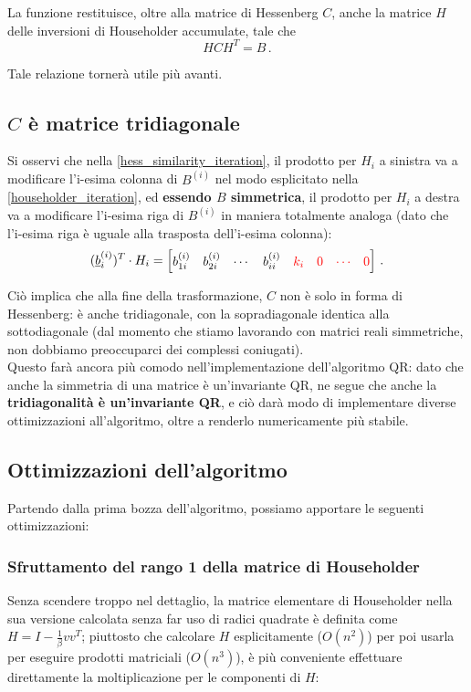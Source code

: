 La funzione restituisce, oltre alla matrice di Hessenberg $C$, anche la matrice 
$H$ delle inversioni di Householder accumulate, tale che
\begin{equation}\label{B_C_similarity}
H C H^T = B \,.
\end{equation}

Tale relazione tornerà utile più avanti.

\subsection{$C$ è matrice tridiagonale}
Si osservi che nella \eqref{hess_similarity_iteration}, il prodotto per $H_i$ a 
sinistra va a modificare l'i-esima colonna di $B^{(i)}$ nel modo esplicitato 
nella \eqref{householder_iteration}, ed \textbf{essendo $B$ simmetrica}, il 
prodotto per $H_i$ a destra va a modificare l'i-esima riga di $B^{(i)}$ in 
maniera totalmente analoga (dato che l'i-esima riga è uguale alla trasposta 
dell'i-esima colonna):
\begin{equation*}
(\underline{b}_{i}^{(i)})^T \cdot H_i = 
\begin{bmatrix}
	b_{1i}^{(i)} &
	b_{2i}^{(i)} &
	\cdots &
	b_{ii}^{(i)} &
	\textcolor{red}{k_i} &
	\textcolor{red}{0} &
	\textcolor{red}{\cdots} &
	\textcolor{red}{0}
\end{bmatrix}
\,.
\end{equation*}

Ciò implica che alla fine della trasformazione, $C$ non è solo in forma di 
Hessenberg: è anche tridiagonale, con la sopradiagonale identica alla 
sottodiagonale (dal momento che stiamo lavorando con matrici reali simmetriche, 
non dobbiamo preoccuparci dei complessi coniugati). \\
Questo farà ancora più comodo nell'implementazione dell'algoritmo QR: dato che 
anche la simmetria di una matrice è un'invariante QR, ne segue che anche la 
\textbf{tridiagonalità è un'invariante QR}, e ciò darà modo di implementare 
diverse ottimizzazioni all'algoritmo, oltre a renderlo numericamente più 
stabile.

\subsection{Ottimizzazioni dell'algoritmo}
Partendo dalla prima bozza dell'algoritmo, possiamo apportare le seguenti 
ottimizzazioni:

\subsubsection{Sfruttamento del rango 1 della matrice di Householder}
Senza scendere troppo nel dettaglio, la matrice elementare di Householder nella 
sua versione calcolata senza far uso di radici quadrate è definita come $H = I - 
\frac{1}{\beta}vv^T$; piuttosto che calcolare $H$ esplicitamente ($O(n^2)$) per 
poi usarla per eseguire prodotti matriciali ($O(n^3)$), è più conveniente 
effettuare direttamente la moltiplicazione per le componenti di $H$:


